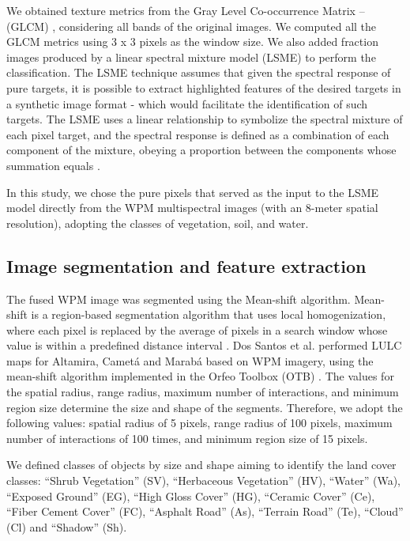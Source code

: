 \documentclass[preprint, 3p,
authoryear]{elsarticle} %
\begin{document}
We obtained texture metrics from the Gray Level Co-occurrence Matrix --
(GLCM) \citep{Haralick1973}, considering all bands of the original
images. We computed all the GLCM metrics using 3 x 3 pixels as the
window size. We also added fraction images produced by a linear spectral
mixture model (LSME) to perform the classification. The LSME technique
assumes that given the spectral response of pure targets, it is possible
to extract highlighted features of the desired targets in a synthetic
image format - which would facilitate the identification of such
targets. The LSME uses a linear relationship to symbolize the spectral
mixture of each pixel target, and the spectral response is defined as a
combination of each component of the mixture, obeying a proportion
between the components whose summation equals \citep{Shimabukuro2019}.

In this study, we chose the pure pixels that served as the input to the
LSME model directly from the WPM multispectral images (with an 8-meter
spatial resolution), adopting the classes of vegetation, soil, and
water.

\hypertarget{image-segmentation-and-feature-extraction}{%
\subsection{Image segmentation and feature
extraction}\label{image-segmentation-and-feature-extraction}}

The fused WPM image was segmented using the Mean-shift algorithm.
Mean-shift is a region-based segmentation algorithm that uses local
homogenization, where each pixel is replaced by the average of pixels in
a search window whose value is within a predefined distance interval
\citep{Comaniciu1997}. Dos Santos et al. \citeyearpar{Santos2022}
performed LULC maps for Altamira, Cametá and Marabá based on WPM
imagery, using the mean-shift algorithm implemented in the Orfeo Toolbox
(OTB) \citep{Grizonnet2017}. The values for the spatial radius, range
radius, maximum number of interactions, and minimum region size
determine the size and shape of the segments. Therefore, we adopt the
following values: spatial radius of 5 pixels, range radius of 100
pixels, maximum number of interactions of 100 times, and minimum region
size of 15 pixels.

We defined classes of objects by size and shape aiming to identify the
land cover classes: ``Shrub Vegetation'' (SV), ``Herbaceous Vegetation''
(HV), ``Water'' (Wa), ``Exposed Ground'' (EG), ``High Gloss Cover''
(HG), ``Ceramic Cover'' (Ce), ``Fiber Cement Cover'' (FC), ``Asphalt
Road'' (As), ``Terrain Road'' (Te), ``Cloud'' (Cl) and ``Shadow'' (Sh).
\end{document}
